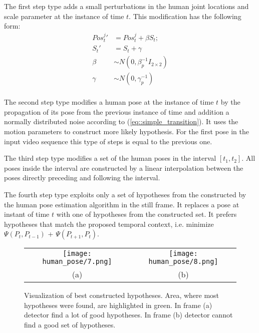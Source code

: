 The first step type adds a small perturbations in the human joint locations and scale parameter at the instance of time $t$. This modification has the following form:
\begin{equation} \label{eq::simple_transition}
	\begin{aligned}
		{Pos_t^j}' &= Pos_t^j + \beta S_t; \\
		{S_t}' &= S_t + \gamma \\
		\beta &\sim N(0, \beta_p^{-1} I_{2 \times 2}) \\
		\gamma &\sim N(0, \gamma_p^{-1}) \\
	\end{aligned}
\end{equation}

The second step type modifies a human pose at the instance of time $t$ by the propagation of its pose from the previous instance of time and addition a normally distributed noise according to  (\ref{eq::simple_transition}). It uses the motion parameters to construct more likely hypothesis. For the first pose in the input video sequence this type of steps is equal to the previous one.

The third step type modifies a set of the human poses in the interval $\left[t_1, t_2\right]$. All poses inside the interval are constructed by a linear interpolation between the poses directly preceding and following the interval.

The fourth step type exploits only a set of hypotheses from the constructed by the human pose estimation algorithm in the still frame. It replaces a pose at instant of time $t$ with one of hypotheses from the constructed set. It prefers hypotheses that match the proposed temporal context, i.e. minimize $\Psi(P_t, P_{t-1})$ + $\Psi(P_{t+1}, P_t)$.

\begin{figure}[t]
	\begin{center}
		\begin{tabular}{cc}
			\texttt{[image: human\_pose/7.png]} & \texttt{[image: human\_pose/8.png]} \\
			(a) & (b)
		\end{tabular}
		\caption{Visualization of best constructed hypotheses. Area, where most hypotheses were found, are highlighted in green. In frame (a) detector find a lot of good hypotheses. In frame (b) detector cannot find a good set of hypotheses.}
		\label{fig:good_bad_hypotheses}
	\end{center}
\end{figure}


